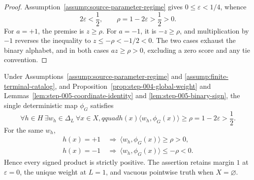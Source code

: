 \begin{proof}
Assumption~\ref{assump:source-parameter-regime} gives
$0\le\varepsilon<1/4$, whence
\[
2\varepsilon<\frac12,
\qquad \rho=1-2\varepsilon>\frac12>0.
\]
For $a=+1$, the premise is $z\ge\rho$.  For $a=-1$, it is
$-z\ge\rho$, and multiplication by $-1$ reverses the inequality to
$z\le-\rho<-1/2<0$.  The two cases exhaust the binary alphabet, and in
both cases $az\ge\rho>0$, excluding a zero score and any tie convention.
\end{proof}

\begin{proposition}
\label{prop:step-005-exact-representation}
Under Assumptions~\ref{assump:source-parameter-regime} and
\ref{assump:finite-terminal-catalog}, and
Proposition~\ref{prop:step-004-global-weight} and
Lemmas~\ref{lem:step-005-coordinate-identity} and
\ref{lem:step-005-binary-sign}, the single deterministic map $\phi_G$
satisfies
\begin{equation}\label{eq:exact-common-map-margin}
\forall h\in H\ \exists w_h\in\Delta_L\ \forall x\in X,qquad
h(x)\langle w_h,\phi_G(x)\rangle
\ge\rho=1-2\varepsilon>\frac12.
\end{equation}
For the same $w_h$,
\begin{align*}
h(x)=+1&\ \Longrightarrow\
\langle w_h,\phi_G(x)\rangle\ge\rho>0,\\
h(x)=-1&\ \Longrightarrow\
\langle w_h,\phi_G(x)\rangle\le-\rho<0.
\end{align*}
Hence every signed product is strictly positive.  The assertion retains
margin $1$ at $\varepsilon=0$, the unique weight at $L=1$, and vacuous
pointwise truth when $X=\varnothing$.
\end{proposition}

